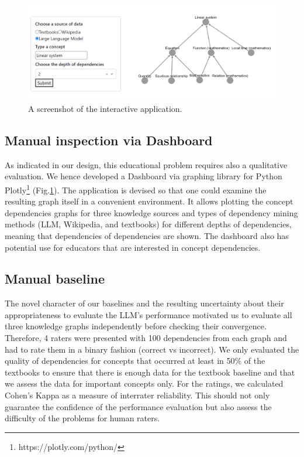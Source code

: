 \documentclass{article}
\begin{document}
\begin{figure}
    \centering
    \includegraphics[width=.95\textwidth]{img/dash_example.png}
    \caption{A screenshot of the interactive application.}
    \label{fig:dash_example}
\end{figure}

\subsection{Manual inspection via Dashboard}
As indicated in our design, this educational problem requires also a qualitative evaluation. We hence developed a Dashboard via graphing library for Python Plotly\footnote{https://plotly.com/python/} (Fig.\ref{fig:dash_example}). The application is devised so that one could examine the resulting graph itself in a convenient environment. It allows plotting the concept dependencies graphs for three knowledge sources and types of dependency mining methods (LLM, Wikipedia, and textbooks) for different depths of dependencies, meaning that dependencies of dependencies are shown. The dashboard also has potential use for educators that are interested in concept dependencies.

\subsection{Manual baseline}
The novel character of our baselines and the resulting uncertainty about their appropriateness to evaluate the LLM's performance motivated us to evaluate all three knowledge graphs independently before checking their convergence. Therefore, 4 raters were presented with 100 dependencies from each graph and had to rate them in a binary fashion (correct vs incorrect). We only evaluated the quality of dependencies for concepts that occurred at least in 50\% of the textbooks to ensure that there is enough data for the textbook baseline and that we assess the data for important concepts only. For the ratings, we calculated Cohen's Kappa as a measure of interrater reliability. This should not only guarantee the confidence of the performance evaluation but also assess the difficulty of the problems for human raters.
\end{document}
